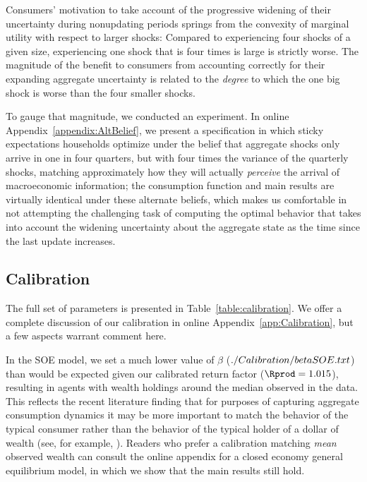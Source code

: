 Consumers' motivation to take account of the progressive widening of their uncertainty during nonupdating periods springs from the convexity of marginal utility with respect to larger shocks: Compared to experiencing four shocks of a given size, experiencing one shock that is four times is large is strictly worse.  The magnitude of the benefit to consumers from accounting correctly for their expanding aggregate uncertainty is related to the \textit{degree} to which the one big shock is worse than the four smaller shocks.

To gauge that magnitude, we conducted an experiment.  In online Appendix~\ref{appendix:AltBelief}, we present a specification in which sticky expectations households optimize under the belief that aggregate shocks only arrive in one in four quarters, but with four times the variance of the quarterly shocks, matching approximately how they will actually \textit{perceive} the arrival of macroeconomic information; the consumption function and main results are virtually identical under these alternate beliefs, which makes us comfortable in not attempting the challenging task of computing the optimal behavior that takes into account the widening uncertainty about the aggregate state as the time since the last update increases.

\subsection{Calibration}\label{sec:calibration}

The full set of parameters is presented in Table~\ref{table:calibration}.  We offer a complete discussion of our calibration in online Appendix~\ref{app:Calibration}, but a few aspects warrant comment here.

In the SOE model, we set a much lower value of $\beta$ ($  ./Calibration/betaSOE.txt $) than would be expected given our calibrated return factor (${\Rprod} = 1.015$), resulting in agents with wealth holdings around the median observed in the data.  This reflects the recent literature finding that for purposes of capturing aggregate consumption dynamics it may be more important to match the behavior of the typical consumer rather than the behavior of the typical holder of a dollar of wealth (see, for example, \cite{opLiquidH2M}).  Readers who prefer a calibration matching \textit{mean} observed wealth can consult the online appendix for a closed economy general equilibrium model, in which we show that the main results still hold.

